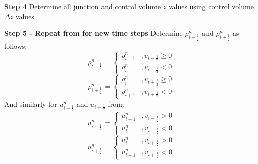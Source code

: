 \documentclass[11pt,letterpaper,titlepage]{article}
\newcommand{\half}{\frac{1}{2}}
\begin{document}
\vspace{0.5cm}\noindent
\textbf{Step 4}\newline
Determine all junction and control volume $z$ values using control volume $\Delta z$ values.




\vspace{0.5cm}\noindent
\textbf{Step 5 - Repeat from for new time steps}\newline
Determine $\rho_{i-\half}^n$ and $\rho_{i+\half}^n$ as follows:
\begin{equation*}
\rho_{i-\half}^n=
\begin{cases}
\rho_{i-1}^n     &,v_{i-\half}\ge 0 \\
\rho_{i}^n    &,v_{i-\half}<0
\end{cases}
\end{equation*}
\begin{equation*}
\rho_{i+\half}^n=
\begin{cases}
\rho_{i}^n     &,v_{i+\half}\ge 0 \\
\rho_{i+1}^n    &,v_{i+\half}<0
\end{cases}
\end{equation*}
And similarly for $u_{i-\half}^n$ and $u_{i+\half}$ from:
\begin{equation*}
u_{i-\half}^n=
\begin{cases}
u_{i-1}^n     &,v_{i-\half}>0 \\
u_{i}^n    &,v_{i-\half}<0
\end{cases}
\end{equation*}
\begin{equation*}
u_{i+\half}^n=
\begin{cases}
u_{i}^n     &,v_{i+\half}>0 \\
u_{i+1}^n    &,v_{i+\half}<0
\end{cases}
\end{equation*}
\end{document}
